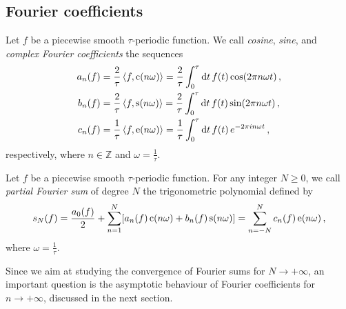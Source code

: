 \subsection{Fourier coefficients}
\begin{definition}
  \label{def:fourier-coef}
  Let $f$ be a piecewise smooth $\tau$-periodic function. We call \emph{cosine},
  \emph{sine}, and \emph{complex Fourier coefficients} the sequences
  \begin{align}
    a_n(f)&=\frac{2}{\tau}\braket{f,\operatorname{c}(n\omega)}
    =\frac{2}{\tau}\int_0^{\tau}\mathrm{d} t\,f(t)\cos(2\pi n\omega t)\,,\\
    b_n(f)&=\frac{2}{\tau}\braket{f,\operatorname{s}(n\omega)}
    =\frac{2}{\tau}\int_0^{\tau}\mathrm{d} t\,f(t)\sin(2\pi n\omega t)\,,\\
    c_n(f)&=\frac{1}{\tau}\braket{f,\operatorname{e}(n\omega)}
    =\frac{1}{\tau}\int_0^{\tau}\mathrm{d} t\,f(t)\,e^{-2\pi i n\omega t}\,,
  \end{align}
  respectively, where $n\in\mathbb{Z}$ and $\omega=\frac{1}{\tau}$.
\end{definition}
\begin{definition}
  \label{def:fourier-partial}
  Let $f$ be a piecewise smooth $\tau$-periodic function. For any integer $N\geq 0$, we
  call \emph{partial Fourier sum} of degree $N$ the trigonometric polynomial defined by
  \begin{equation}
    s_N(f)=\frac{a_0(f)}{2}+\sum_{n=1}^N[a_n(f)\operatorname{c}(n\omega)+b_n(f)\operatorname{s}(n\omega)]=
    \sum_{n=-N}^{N}c_n(f)\operatorname{e}(n\omega)\,,
  \end{equation}
  where $\omega=\frac{1}{\tau}$.
\end{definition}
Since we aim at studying the convergence of Fourier sums for $N\to+\infty$, an important
question is the asymptotic behaviour of Fourier coefficients for $n\to+\infty$, discussed
in the next section.
